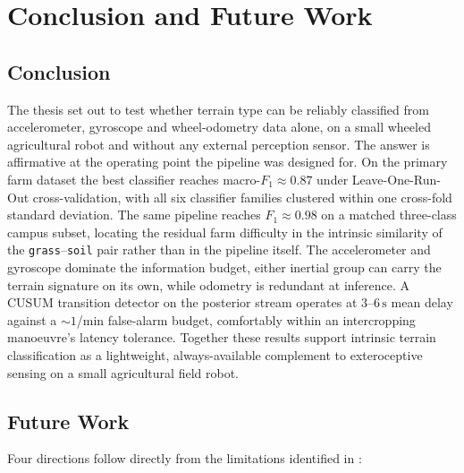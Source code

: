 \chapter{Conclusion and Future Work}
\label{ch:conclusion}

\section{Conclusion}

The thesis set out to test whether terrain type can be reliably classified from accelerometer, gyroscope and wheel-odometry data alone, on a small wheeled agricultural robot and without any external perception sensor. The answer is affirmative at the operating point the pipeline was designed for. On the primary farm dataset the best classifier reaches macro-$F_1 \approx 0.87$ under Leave-One-Run-Out cross-validation, with all six classifier families clustered within one cross-fold standard deviation. The same pipeline reaches $F_1 \approx 0.98$ on a matched three-class campus subset, locating the residual farm difficulty in the intrinsic similarity of the \texttt{grass}--\texttt{soil} pair rather than in the pipeline itself. The accelerometer and gyroscope dominate the information budget, either inertial group can carry the terrain signature on its own, while odometry is redundant at inference. A CUSUM transition detector on the posterior stream operates at $3$--$6\,\text{s}$ mean delay against a $\sim 1$/min false-alarm budget, comfortably within an intercropping manoeuvre's latency tolerance. Together these results support intrinsic terrain classification as a lightweight, always-available complement to exteroceptive sensing on a small agricultural field robot.

\section{Future Work}

Four directions follow directly from the limitations identified in :


